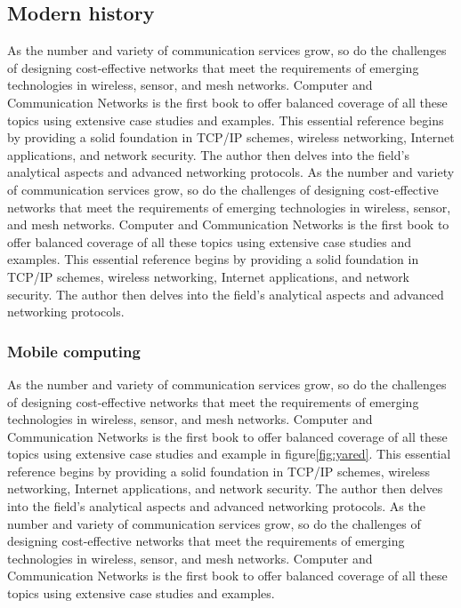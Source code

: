     \subsection{Modern history}
    As the number and variety of communication services grow, so do the challenges of designing cost-effective networks that meet the requirements of emerging technologies in wireless, sensor, and mesh networks. Computer and Communication Networks is the first book to offer balanced coverage of all these topics using extensive case studies and examples.
This essential reference begins by providing a solid foundation in TCP/IP schemes, wireless networking, Internet applications, and network security. The author then delves into the field's analytical aspects and advanced networking protocols.
As the number and variety of communication services grow, so do the challenges of designing cost-effective networks that meet the requirements of emerging technologies in wireless, sensor, and mesh networks. Computer and Communication Networks is the first book to offer balanced coverage of all these topics using extensive case studies and examples.
This essential reference begins by providing a solid foundation in TCP/IP schemes, wireless networking, Internet applications, and network security. The author then delves into the field's analytical aspects and advanced networking protocols.

        \subsubsection{Mobile computing}
        As the number and variety of communication services grow, so do the challenges of designing cost-effective networks that meet the requirements of emerging technologies in wireless, sensor, and mesh networks. Computer and Communication Networks is the first book to offer balanced coverage of all these topics using extensive case studies and example in figure\ref{fig:yared}.
This essential reference begins by providing a solid foundation in TCP/IP schemes, wireless networking, Internet applications, and network security. The author then delves into the field's analytical aspects and advanced networking protocols.
As the number and variety of communication services grow, so do the challenges of designing cost-effective networks that meet the requirements of emerging technologies in wireless, sensor, and mesh networks. Computer and Communication Networks is the first book to offer balanced coverage of all these topics using extensive case studies and examples.

